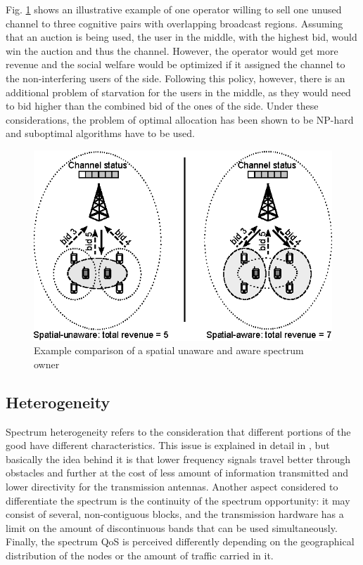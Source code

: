 Fig. \ref{fig:SpecReuse} shows an illustrative example of one operator willing to sell one unused channel to three cognitive pairs with overlapping broadcast regions. Assuming that an auction is being used, the user in the middle, with the highest bid, would win the auction and thus the channel. However, the operator would get more revenue and the social welfare would be optimized if it assigned the channel to the non-interfering users of the side. Following this policy, however, there is an additional problem of starvation for the users in the middle, as they would need to bid higher than the combined bid of the ones of the side. Under these considerations, the problem of optimal allocation has been shown to be NP-hard \cite{ref:Gopinathan2011} and suboptimal algorithms have to be used.

\begin{figure}[!ht]
  \begin{center}
  \includegraphics[scale=1]{Fig2.eps}
  \end{center}
  \caption{Example comparison of a spatial unaware and aware spectrum owner}
   \label{fig:SpecReuse}
\end{figure}

\subsection{Heterogeneity}
\label{subsec:Differentiation}
Spectrum heterogeneity \cite{ref:Gao2011,ref:Duan2011_Contract,ref:Xing2007,ref:Jia2008,ref:Niyato2008_Comp,ref:Min2011,ref:Dixit2010,ref:Niyato2007_Eq} refers to the consideration that different portions of the good have  different characteristics. This issue is explained in detail in \cite{ref:Xing2007}, but basically the idea behind it is that lower frequency signals travel better through obstacles and further at the cost of less amount of information transmitted and lower directivity for the transmission antennas. Another aspect considered to differentiate the spectrum is the continuity of the spectrum opportunity: it may consist of several, non-contiguous blocks, and the transmission hardware has a limit on the amount of discontinuous bands that can be used simultaneously. Finally, the spectrum QoS is perceived differently depending on the geographical distribution of the nodes or the amount of traffic carried in it.

